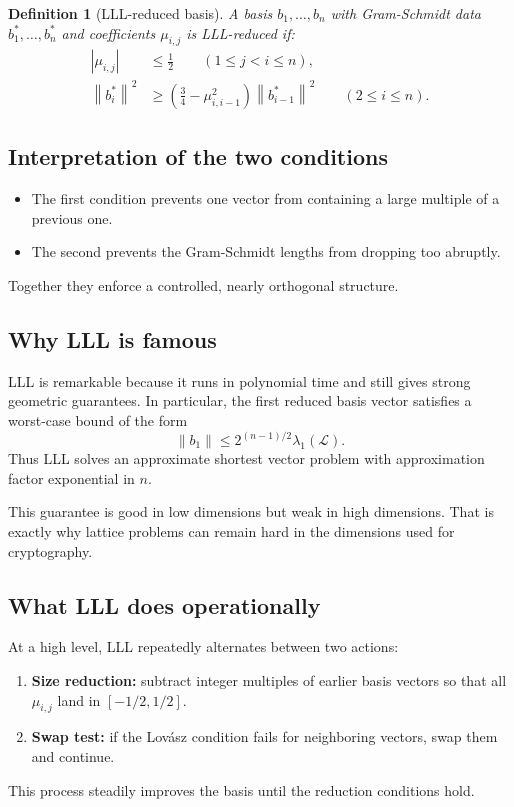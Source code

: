 \documentclass[11pt]{article}
\newtheorem{definition}[theorem]{Definition}
\newenvironment{warningbox}{%
  \def\FrameCommand{\fboxrule=0.8pt \fboxsep=8pt \colorbox{warnred}}%
  \MakeFramed{\advance\hsize-\width \FrameRestore}}{\endMakeFramed}
\newcommand{\norm}[1]{\left\lVert #1 \right\rVert}
\newcommand{\calL}{\mathcal{L}}
\begin{document}
\begin{definition}[LLL-reduced basis]
A basis $b_1,\dots,b_n$ with Gram-Schmidt data $b_1^*,\dots,b_n^*$ and coefficients $\mu_{i,j}$ is LLL-reduced if:
\begin{align}
|\mu_{i,j}| &\le \frac12 \qquad (1\le j<i\le n), \\
\norm{b_i^*}^2 &\ge \left(\frac34-\mu_{i,i-1}^2\right)\norm{b_{i-1}^*}^2 \qquad (2\le i\le n).
\end{align}
\end{definition}

\subsection{Interpretation of the two conditions}
\begin{itemize}
    \item The first condition prevents one vector from containing a large multiple of a previous one.
    \item The second prevents the Gram-Schmidt lengths from dropping too abruptly.
\end{itemize}
Together they enforce a controlled, nearly orthogonal structure.

\subsection{Why LLL is famous}
LLL is remarkable because it runs in polynomial time and still gives strong geometric guarantees. In particular, the first reduced basis vector satisfies a worst-case bound of the form
\[
\norm{b_1}\le 2^{(n-1)/2} \lambda_1(\calL).
\]
Thus LLL solves an approximate shortest vector problem with approximation factor exponential in $n$.

\begin{warningbox}
This guarantee is good in low dimensions but weak in high dimensions. That is exactly why lattice problems can remain hard in the dimensions used for cryptography.
\end{warningbox}

\subsection{What LLL does operationally}
At a high level, LLL repeatedly alternates between two actions:
\begin{enumerate}
    \item \textbf{Size reduction:} subtract integer multiples of earlier basis vectors so that all $\mu_{i,j}$ land in $[-1/2,1/2]$.
    \item \textbf{Swap test:} if the Lov\'asz condition fails for neighboring vectors, swap them and continue.
\end{enumerate}
This process steadily improves the basis until the reduction conditions hold.
\end{document}
